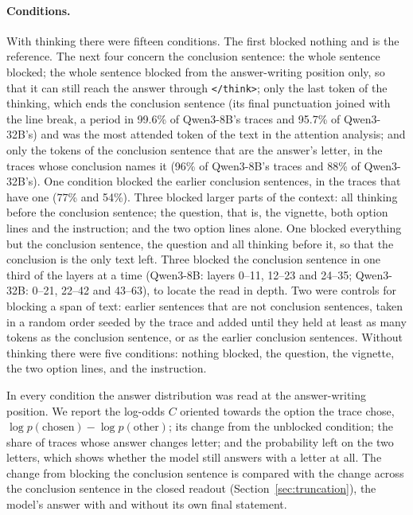 \documentclass[11pt]{article}
\begin{document}
\paragraph{Conditions.}
With thinking there were fifteen conditions. The first blocked nothing and is the reference. The next four concern the conclusion sentence: the whole sentence blocked; the whole sentence blocked from the answer-writing position only, so that it can still reach the answer through \texttt{</think>}; only the last token of the thinking, which ends the conclusion sentence (its final punctuation joined with the line break, a period in 99.6\% of Qwen3-8B's traces and 95.7\% of Qwen3-32B's) and was the most attended token of the text in the attention analysis; and only the tokens of the conclusion sentence that are the answer's letter, in the traces whose conclusion names it (96\% of Qwen3-8B's traces and 88\% of Qwen3-32B's). One condition blocked the earlier conclusion sentences, in the traces that have one (77\% and 54\%). Three blocked larger parts of the context: all thinking before the conclusion sentence; the question, that is, the vignette, both option lines and the instruction; and the two option lines alone. One blocked everything but the conclusion sentence, the question and all thinking before it, so that the conclusion is the only text left. Three blocked the conclusion sentence in one third of the layers at a time (Qwen3-8B: layers 0--11, 12--23 and 24--35; Qwen3-32B: 0--21, 22--42 and 43--63), to locate the read in depth. Two were controls for blocking a span of text: earlier sentences that are not conclusion sentences, taken in a random order seeded by the trace and added until they held at least as many tokens as the conclusion sentence, or as the earlier conclusion sentences. Without thinking there were five conditions: nothing blocked, the question, the vignette, the two option lines, and the instruction.

In every condition the answer distribution was read at the answer-writing position. We report the log-odds $C$ oriented towards the option the trace chose, $\log p(\text{chosen}) - \log p(\text{other})$; its change from the unblocked condition; the share of traces whose answer changes letter; and the probability left on the two letters, which shows whether the model still answers with a letter at all. The change from blocking the conclusion sentence is compared with the change across the conclusion sentence in the closed readout (Section~\ref{sec:truncation}), the model's answer with and without its own final statement.
\end{document}
